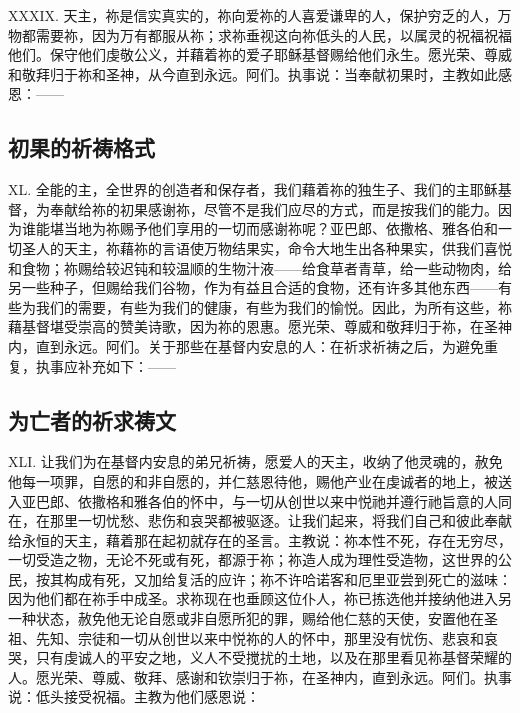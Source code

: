 XXXIX. 天主，祢是信实真实的，祢向爱祢的人喜爱谦卑的人，保护穷乏的人，万物都需要祢，因为万有都服从祢；求祢垂视这向祢低头的人民，以属灵的祝福祝福他们。保守他们虔敬公义，并藉着祢的爱子耶稣基督赐给他们永生。愿光荣、尊威和敬拜归于祢和圣神，从今直到永远。阿们。执事说：当奉献初果时，主教如此感恩：——\par


\subsection{初果的祈祷格式}

XL. 全能的主，全世界的创造者和保存者，我们藉着祢的独生子、我们的主耶稣基督，为奉献给祢的初果感谢祢，尽管不是我们应尽的方式，而是按我们的能力。因为谁能堪当地为祢赐予他们享用的一切而感谢祢呢？亚巴郎、依撒格、雅各伯和一切圣人的天主，祢藉祢的言语使万物结果实，命令大地生出各种果实，供我们喜悦和食物；祢赐给较迟钝和较温顺的生物汁液——给食草者青草，给一些动物肉，给另一些种子，但赐给我们谷物，作为有益且合适的食物，还有许多其他东西——有些为我们的需要，有些为我们的健康，有些为我们的愉悦。因此，为所有这些，祢藉基督堪受崇高的赞美诗歌，因为祢的恩惠。愿光荣、尊威和敬拜归于祢，在圣神内，直到永远。阿们。关于那些在基督内安息的人：在祈求祈祷之后，为避免重复，执事应补充如下：——\par


\subsection{为亡者的祈求祷文}

XLI. 让我们为在基督内安息的弟兄祈祷，愿爱人的天主，收纳了他灵魂的，赦免他每一项罪，自愿的和非自愿的，并仁慈恩待他，赐他产业在虔诚者的地上，被送入亚巴郎、依撒格和雅各伯的怀中，与一切从创世以来中悦祂并遵行祂旨意的人同在，在那里一切忧愁、悲伤和哀哭都被驱逐。让我们起来，将我们自己和彼此奉献给永恒的天主，藉着那在起初就存在的圣言。主教说：祢本性不死，存在无穷尽，一切受造之物，无论不死或有死，都源于祢；祢造人成为理性受造物，这世界的公民，按其构成有死，又加给复活的应许；祢不许哈诺客和厄里亚尝到死亡的滋味：因为他们都在祢手中成圣。求祢现在也垂顾这位仆人，祢已拣选他并接纳他进入另一种状态，赦免他无论自愿或非自愿所犯的罪，赐给他仁慈的天使，安置他在圣祖、先知、宗徒和一切从创世以来中悦祢的人的怀中，那里没有忧伤、悲哀和哀哭，只有虔诚人的平安之地，义人不受搅扰的土地，以及在那里看见祢基督荣耀的人。愿光荣、尊威、敬拜、感谢和钦崇归于祢，在圣神内，直到永远。阿们。执事说：低头接受祝福。主教为他们感恩说：\par

